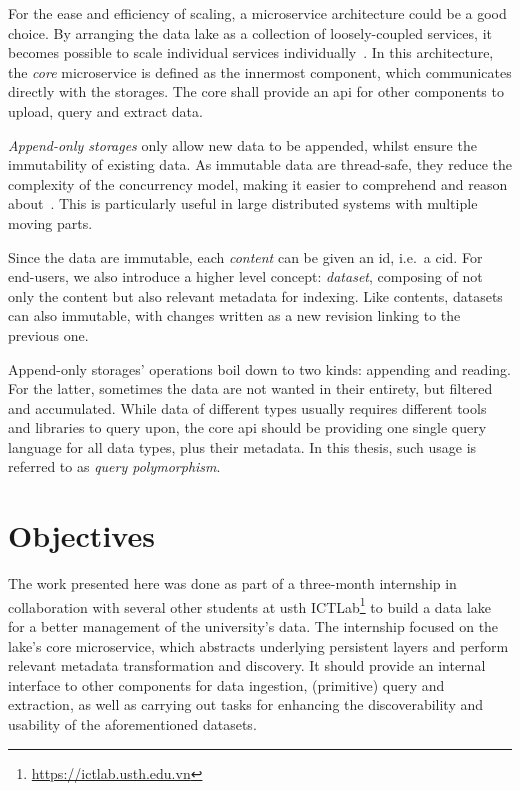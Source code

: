 \documentclass[a4paper,oneside,12pt]{book}
\begin{document}
For the ease and efficiency of scaling, a microservice architecture
could be a good choice.  By arranging the data lake as a collection
of loosely-coupled services, it becomes possible to scale individual services
individually~\cite{micro}.  In this architecture, the \emph{core} microservice
is defined as the innermost component, which communicates directly
with the storages.  The core shall provide an \gls{api} for other components
to upload, query and extract data.

\emph{Append-only storages} only allow new data to be appended, whilst ensure
the immutability of existing data.  As immutable data are thread-safe,
they reduce the complexity of the concurrency model, making it easier
to comprehend and reason about~\cite{pure}.  This is particularly useful
in large distributed systems with multiple moving parts.

Since the data are immutable, each \emph{\gls{content}} can be given
an \gls{id}, i.e.~a \gls{cid}.  For end-users, we also introduce
a higher level concept: \emph{dataset}, composing of not only the content
but also relevant metadata for indexing.  Like contents, datasets can also
immutable, with changes written as a new revision linking to the previous one.

Append-only storages' operations boil down to two kinds: appending and reading.
For the latter, sometimes the data are not wanted in their entirety,
but filtered and accumulated.  While data of different types usually requires
different tools and libraries to query upon, the core \gls{api} should be
providing one single query language for all data types, plus their metadata.
In this thesis, such usage is referred to as \emph{query polymorphism}.

\section{Objectives}
The work presented here was done as part of a three-month internship
in collaboration with several other students
at \gls{usth} ICTLab\footnote{\url{https://ictlab.usth.edu.vn}} to build
a data lake for a better management of the university's data.  The internship
focused on the lake's core microservice, which abstracts underlying
persistent layers and perform relevant metadata transformation and discovery.
It should provide an internal interface to other components for data ingestion,
(primitive) query and extraction, as well as carrying out tasks for enhancing
the discoverability and usability of the aforementioned datasets.
\end{document}

